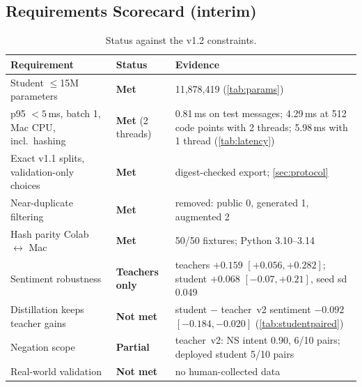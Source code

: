 \documentclass[11pt,a4paper]{article}
\theoremstyle{remark}
\begin{document}
\subsection{Requirements Scorecard (interim)}
\begin{table}[h]
\centering\small
\caption{Status against the v1.2 constraints.}
\label{tab:scorecard}
\begin{tabularx}{\linewidth}{@{}l l X@{}}
\toprule
Requirement & Status & Evidence \\
\midrule
Student $\le$15M parameters & \textcolor{okgreen}{\textbf{Met}} & 11{,}878{,}419 (\cref{tab:params}) \\
p95 $<5$\,ms, batch 1, Mac CPU, incl.\ hashing & \textcolor{okgreen}{\textbf{Met}} (2 threads) & 0.81\,ms on test messages; 4.29\,ms at 512 code points with 2 threads; 5.98\,ms with 1 thread (\cref{tab:latency}) \\
Exact v1.1 splits, validation-only choices & \textcolor{okgreen}{\textbf{Met}} & digest-checked export; \cref{sec:protocol} \\
Near-duplicate filtering & \textcolor{okgreen}{\textbf{Met}} & removed: public 0, generated 1, augmented 2 \\
Hash parity Colab $\leftrightarrow$ Mac & \textcolor{okgreen}{\textbf{Met}} & 50/50 fixtures; Python 3.10--3.14 \\
Sentiment robustness & \textcolor{pending}{\textbf{Teachers only}} & teachers $+0.159$ $[+0.056, +0.282]$; student $+0.068$ $[-0.07, +0.21]$, seed sd 0.049 \\
Distillation keeps teacher gains & \textcolor{warn}{\textbf{Not met}} & student $-$ teacher~v2 sentiment $-0.092$ $[-0.184, -0.020]$ (\cref{tab:studentpaired}) \\
Negation scope & \textcolor{pending}{\textbf{Partial}} & teacher~v2: NS intent 0.90, 6/10 pairs; deployed student 5/10 pairs \\
Real-world validation & \textcolor{warn}{\textbf{Not met}} & no human-collected data \\
\bottomrule
\end{tabularx}
\end{table}

\appendix
\end{document}
